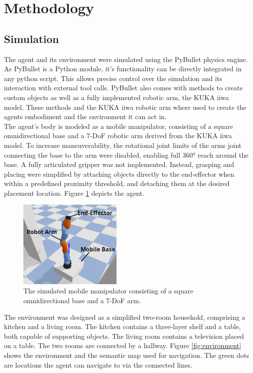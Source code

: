 \documentclass[../report.tex]{subfiles}
\begin{document}
\section{Methodology}
\label{sec:methodology}

\subsection{Simulation}
The agent and its environment were simulated using the PyBullet physics engine. As PyBullet is a Python module, it's functionality can be directly integrated in any python script. This allows precise control over the simulation and its interaction with external tool calls. PyBullet also comes with methods to create custom objects as well as a fully implemented robotic arm, the KUKA iiwa model. These methods and the KUKA iiwa robotic arm where used to create the agents embodiment and the environment it can act in. \\
The agent's body is modeled as a mobile manipulator, consisting of a square omnidirectional base and a 7-DoF robotic arm derived from the KUKA iiwa model.
To increase maneuverability, the rotational joint limits of the arms joint connecting the base to the arm were disabled, enabling full 360° reach around the base. A fully articulated gripper was not implemented. Instead, grasping and placing were simplified by attaching objects directly to the end-effector when within a predefined proximity threshold, and detaching them at the desired placement location. Figure \ref{fig:agent} depicts the agent.

\begin{figure}[h!]
	\centering
	\includegraphics[width=0.45\textwidth]{figures/agent.png}
	\caption{The simulated mobile manipulator consisting of a square omnidirectional base and a 7-DoF arm.}
	\label{fig:agent}
\end{figure}

The environment was designed as a simplified two-room household, comprising a kitchen and a living room. The kitchen contains a three-layer shelf and a table, both capable of supporting objects. The living room contains a television placed on a table. The two rooms are connected by a hallway. Figure \ref{fig:environment} shows the environment and the semantic map used for navigation. The green dots are locations the agent can navigate to via the connected lines.
\end{document}

